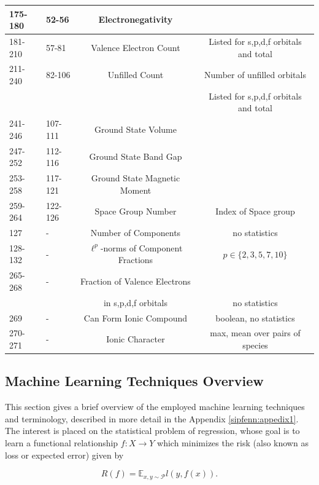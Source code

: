 \begin{table}[H]
\begin{tabular}{|p{2cm}|p{2cm}|c|c|}
        \hline
        175-180 & 52-56 & Electronegativity & \\ 
        \hline
        181-210 & 57-81 & Valence Electron Count & Listed for s,p,d,f orbitals and total \\ 
        \hline
        211-240 & 82-106 & Unfilled Count & Number of unfilled orbitals \\
         & & & Listed for s,p,d,f orbitals and total \\
         \hline
        241-246 & 107-111 & Ground State Volume & \\ 
        \hline
        247-252 & 112-116 & Ground State Band Gap & \\ 
        \hline
        253-258 & 117-121 & Ground State Magnetic Moment & \\ 
        \hline
        259-264 & 122-126 & Space Group Number & Index of Space group\\
        \hline
        127 & - & Number of Components & no statistics \\
        \hline
        128-132 & - & $\ell^p$-norms of Component Fractions & $p \in \{2,3,5,7,10\}$ \\
        \hline
        265-268 & - & Fraction of Valence Electrons & \\
        & & in s,p,d,f orbitals & no statistics\\
        \hline
        269 & - & Can Form Ionic Compound & boolean, no statistics\\
        \hline
        270-271 & - & Ionic Character & max, mean over pairs of species\\
        \hline
    \end{tabular}
    \label{sipfenn:feature-table}
\end{table}

\subsection{Machine Learning Techniques Overview} \label{sipfenn:ref:machinelearningoverview}
This section gives a brief overview of the employed machine learning techniques and terminology, described in more detail in the Appendix \ref{sipfenn:appedix1}. The interest is placed on the statistical problem of regression, whose goal is to learn a functional relationship $f:X\rightarrow Y$ which minimizes the risk (also known as loss or expected error) \cite{vapnik1999overview} given by

\begin{equation} \label{sipfenn:true_risk}
    R(f) = \mathbb{E}_{x,y\sim \mathcal{P}} l(y,f(x)).
\end{equation}

